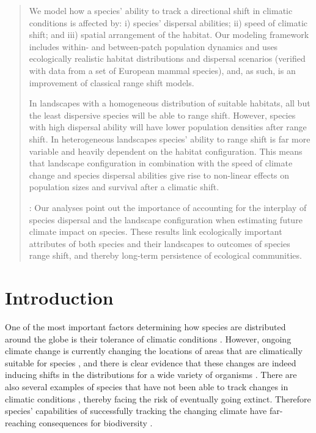 \documentclass[12pt,pdftex]{article}
\begin{document}
\begin{spacing}{2}
\begin{abstract}
  We model how a species' ability to track a directional shift in climatic conditions is affected by: i) species' dispersal abilities; ii) speed of climatic shift; and iii) spatial arrangement of the habitat. Our modeling framework includes within- and between-patch population dynamics and uses ecologically realistic habitat distributions and dispersal scenarios (verified with data from a set of  European mammal species), and, as such, is an improvement of classical range shift models. 

  In landscapes with a homogeneous distribution of suitable habitats, all but the least dispersive species will be able to range shift. However, species with high dispersal ability will have lower population densities after range shift. In heterogeneous landscapes species' ability to range shift is far more variable and heavily dependent on the habitat configuration. This means that landscape configuration in combination with the speed of climate change and species dispersal abilities give rise to non-linear effects on population sizes and survival after a climatic shift.

  : Our analyses point out the importance of accounting for the interplay of species dispersal and the landscape configuration when estimating future climate impact on species. These results link ecologically important attributes of both species and their landscapes to outcomes of species range shift, and thereby long-term persistence of ecological communities.
\end{abstract}
\clearpage

\section*{Introduction}
One of the most important factors determining how species are distributed around the globe is their tolerance of climatic conditions \citep{Thomas2010}. However, ongoing climate change is currently changing the locations of areas that are climatically suitable for species \citep{Loarie2009}, and there is clear evidence that these changes are indeed inducing shifts in the distributions for a wide variety of organisms \citep{Parmesan2003, Chen2011,Lenoir2015}. There are also several examples of species that have not been able to track changes in climatic conditions \citep{Maclean2011}, thereby facing the risk of eventually going extinct. Therefore species' capabilities of successfully tracking the changing climate have far-reaching consequences for biodiversity \citep{Thuiller2005a}. 


\end{spacing}
\end{document}
